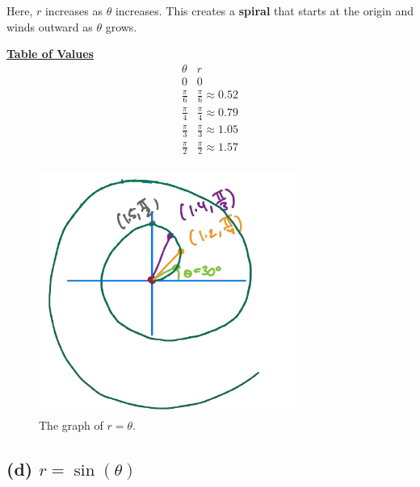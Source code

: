 \documentclass{article}
\begin{document}
\begin{solutionbox}
Here, \( r \) increases as \( \theta \) increases. This creates a \textbf{spiral} that starts at the origin and winds outward as \( \theta \) grows. 

\begin{conceptbox}
    \textbf{\underline{Table of Values}}
    \[
    \begin{array}{c|c}
    \theta & r \\
    \hline
    0 & 0 \\
    \frac{\pi}{6} & \frac{\pi}{6} \approx 0.52 \\
    \frac{\pi}{4} & \frac{\pi}{4} \approx 0.79 \\
    \frac{\pi}{3} & \frac{\pi}{3} \approx 1.05 \\
    \frac{\pi}{2} & \frac{\pi}{2} \approx 1.57 \\
    \end{array}
    \]
\end{conceptbox}
\begin{figure}[H]
    \centering
    \includegraphics[width=0.75\textwidth]{polar curve sketch c.png}
    \caption{The graph of \( r = \theta \).}
    \label{fig:spiral_graph}
\end{figure}
\end{solutionbox}

\subsection*{(d) \( r = \sin(\theta) \)}
\end{document}
